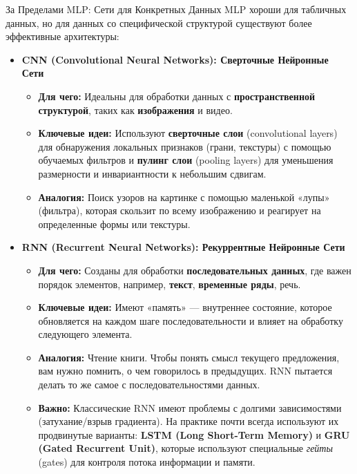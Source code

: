 \begin{textbox}{За Пределами MLP: Сети для Конкретных Данных}
    MLP хороши для табличных данных, но для данных со специфической структурой существуют более эффективные архитектуры:

    \begin{itemize}
        \item \textbf{CNN (Convolutional Neural Networks): Сверточные Нейронные Сети}
            \begin{itemize}
                \item \textbf{Для чего:} Идеальны для обработки данных с \textbf{пространственной структурой}, таких как \textbf{изображения} и видео.
                \item \textbf{Ключевые идеи:} Используют \textbf{сверточные слои} (convolutional layers) для обнаружения локальных признаков (грани, текстуры) с помощью обучаемых фильтров и \textbf{пулинг слои} (pooling layers) для уменьшения размерности и инвариантности к небольшим сдвигам.
                \item \textbf{Аналогия:} Поиск узоров на картинке с помощью маленькой «лупы» (фильтра), которая скользит по всему изображению и реагирует на определенные формы или текстуры.
            \end{itemize}

        \item \textbf{RNN (Recurrent Neural Networks): Рекуррентные Нейронные Сети}
            \begin{itemize}
                \item \textbf{Для чего:} Созданы для обработки \textbf{последовательных данных}, где важен порядок элементов, например, \textbf{текст}, \textbf{временные ряды}, речь.
                \item \textbf{Ключевые идеи:} Имеют «память» — внутреннее состояние, которое обновляется на каждом шаге последовательности и влияет на обработку следующего элемента.
                \item \textbf{Аналогия:} Чтение книги. Чтобы понять смысл текущего предложения, вам нужно помнить, о чем говорилось в предыдущих. RNN пытается делать то же самое с последовательностями данных.
                \item \textbf{Важно:} Классические RNN имеют проблемы с долгими зависимостями (затухание/взрыв градиента). На практике почти всегда используют их продвинутые варианты: \textbf{LSTM (Long Short-Term Memory)} и \textbf{GRU (Gated Recurrent Unit)}, которые используют специальные \textit{гейты} (gates) для контроля потока информации и памяти.
            \end{itemize}
    \end{itemize}
\end{textbox}


